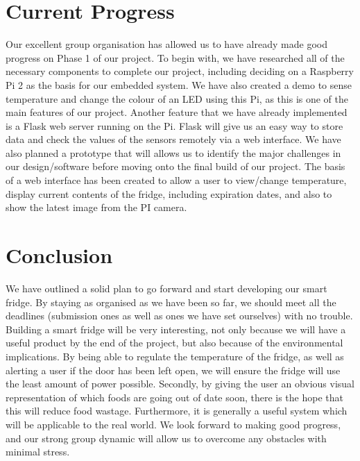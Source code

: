 \documentclass[10pt]{article}
\begin{document}
\newpage
\section{Current Progress}

Our excellent group organisation has allowed us to have already made good progress on Phase 1 of our project. To begin with, we have researched all of the necessary components to complete our project, including deciding on a Raspberry Pi 2 as the basis for our embedded system. We have also created a demo to sense temperature and change the colour of an LED using this Pi, as this is one of the main features of our project. Another feature that we have already implemented is a Flask web server running on the Pi. Flask will give us an easy way to store data and check the values of the sensors remotely via a web interface. We have also planned a prototype that will allows us to identify the major challenges in our design/software before moving onto the final build of our project. The basis of a web interface has been created to allow a user to view/change temperature, display current contents of the fridge, including expiration dates, and also to show the latest image from the PI camera.

\section{Conclusion}

We have outlined a solid plan to go forward and start developing our smart fridge. By staying as organised as we have been so far, we should meet all the deadlines (submission ones as well as ones we have set ourselves) with no trouble. Building a smart fridge will be very interesting, not only because we will have a useful product by the end of the project, but also because of the environmental implications. By being able to regulate the temperature of the fridge, as well as alerting a user if the door has been left open, we will ensure the fridge will use the least amount of power possible. Secondly, by giving the user an obvious visual representation of which foods are going out of date soon, there is the hope that this will reduce food wastage. Furthermore, it is generally a useful system which will be applicable to the real world. We look forward to making good progress, and our strong group dynamic will allow us to overcome any obstacles with minimal stress.
\end{document}
